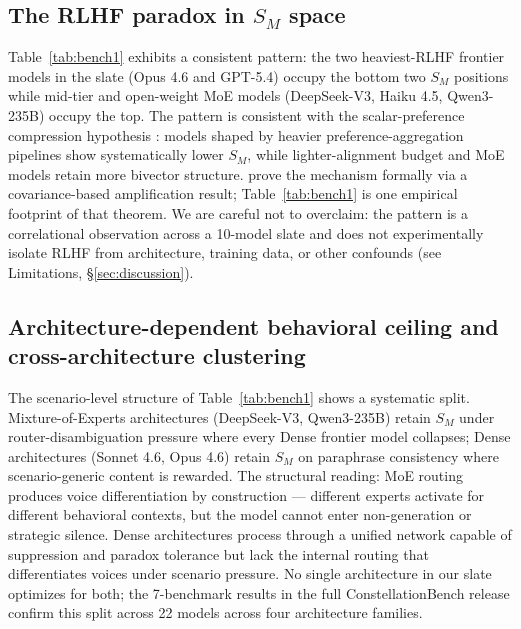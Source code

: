 \documentclass{article}
\begin{document}
\subsection{The RLHF paradox in $S_M$ space}
\label{sec:empirical:paradox}
Table~\ref{tab:bench1} exhibits a consistent pattern: the two heaviest-RLHF frontier models in the slate (Opus 4.6 and GPT-5.4) occupy the bottom two $S_M$ positions while mid-tier and open-weight MoE models (DeepSeek-V3, Haiku 4.5, Qwen3-235B) occupy the top. The pattern is consistent with the scalar-preference compression hypothesis \citep{christiano2017deep, kirk2024understanding}: models shaped by heavier preference-aggregation pipelines show systematically lower $S_M$, while lighter-alignment budget and MoE models retain more bivector structure. \citet{shapira2026rlhf} prove the mechanism formally via a covariance-based amplification result; Table~\ref{tab:bench1} is one empirical footprint of that theorem. We are careful not to overclaim: the pattern is a correlational observation across a 10-model slate and does not experimentally isolate RLHF from architecture, training data, or other confounds (see Limitations, \S\ref{sec:discussion}).

\subsection{Architecture-dependent behavioral ceiling and cross-architecture clustering}
\label{sec:empirical:arch}
The scenario-level structure of Table~\ref{tab:bench1} shows a systematic split. Mixture-of-Experts architectures (DeepSeek-V3, Qwen3-235B) retain $S_M$ under router-disambiguation pressure where every Dense frontier model collapses; Dense architectures (Sonnet 4.6, Opus 4.6) retain $S_M$ on paraphrase consistency where scenario-generic content is rewarded. The structural reading: MoE routing produces voice differentiation by construction --- different experts activate for different behavioral contexts, but the model cannot enter non-generation or strategic silence. Dense architectures process through a unified network capable of suppression and paradox tolerance but lack the internal routing that differentiates voices under scenario pressure. No single architecture in our slate optimizes for both; the 7-benchmark results in the full ConstellationBench release confirm this split across 22 models across four architecture families.
\end{document}
